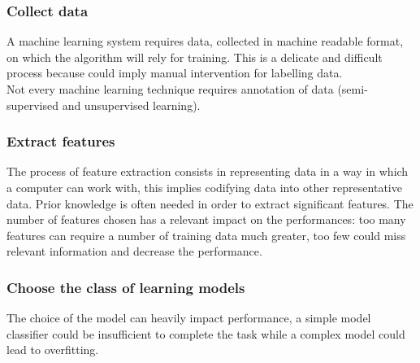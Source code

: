     \subsubsection*{Collect data}
        A machine learning system requires data, collected in machine readable format, on which the algorithm will rely for training. This is a delicate and difficult process because could imply manual intervention for labelling data.\\
        Not every machine learning technique requires annotation of data (semi-supervised and unsupervised learning).
        
    \subsubsection*{Extract features}
        The process of feature extraction consists in representing data in a way in which a computer can work with, this implies codifying data into other representative data.
        Prior knowledge is often needed in order to extract significant features. The number of features chosen has a relevant impact on the performances: too many features can require a number of training data much greater, too few could miss relevant information and decrease the performance.
    
    \subsubsection*{Choose the class of learning models}
        The choice of the model can heavily impact performance, a simple model classifier could be insufficient to complete the task while a complex model could lead to overfitting. 
        
